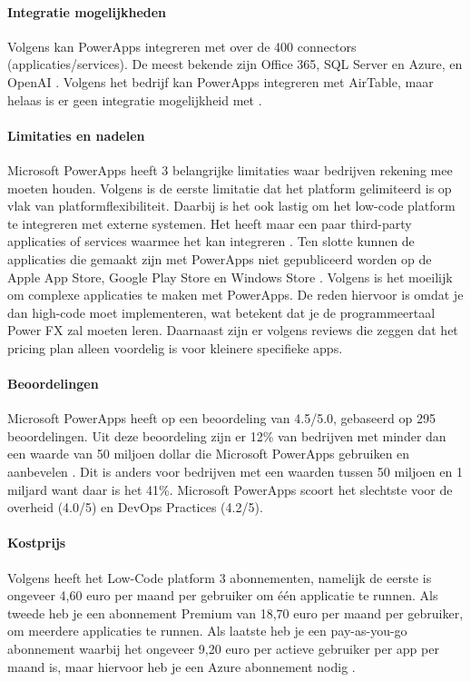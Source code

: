 \paragraph{Integratie mogelijkheden}
Volgens \textcite{Nguyen} kan PowerApps integreren met over de 400 connectors (applicaties/services). De meest bekende 
zijn Office 365, SQL Server en Azure,  en OpenAI \autocite{Nguyen}. Volgens het bedrijf \textcite{Microsoft2024} kan PowerApps integreren met 
AirTable, maar helaas is er geen integratie mogelijkheid met \textcite{MAKE.com2024a}.
\paragraph*{Limitaties en nadelen}
Microsoft PowerApps heeft 3 belangrijke limitaties waar bedrijven rekening mee moeten houden. 
Volgens \textcite{Gupta2023} is de eerste limitatie dat het platform gelimiteerd is op vlak van platformflexibiliteit.
Daarbij is het ook lastig om het low-code platform te integreren met externe systemen. Het heeft maar een paar 
third-party applicaties of services waarmee het kan integreren \autocite{Gupta2023}. Ten slotte kunnen de applicaties die gemaakt zijn met
PowerApps niet gepubliceerd worden op de Apple App Store, Google Play Store en Windows Store \autocite{Gupta2023}.
Volgens \textcite{Nguyen} is het moeilijk om complexe applicaties te maken met PowerApps.
De reden hiervoor is omdat je dan high-code moet implementeren, wat betekent dat je de programmeertaal Power FX zal moeten leren.
Daarnaast zijn er volgens \textcite{Nguyen} reviews die zeggen dat het pricing plan alleen voordelig is voor kleinere specifieke apps.
\paragraph{Beoordelingen}
Microsoft PowerApps heeft op \textcite{Gartner2024} een beoordeling van 4.5/5.0, gebaseerd op 295 beoordelingen.
Uit deze beoordeling zijn er 12\% van bedrijven met minder dan een waarde van 50 miljoen dollar die Microsoft PowerApps gebruiken en aanbevelen \autocite{Gartner2024}.
Dit is anders voor bedrijven met een waarden tussen 50 miljoen en 1 miljard want daar is het 41\%.
Microsoft PowerApps scoort het slechtste voor de overheid (4.0/5) en DevOps Practices (4.2/5).

\paragraph{Kostprijs}
Volgens \textcite{Gupta2023} heeft het Low-Code platform 3 abonnementen, namelijk de eerste is ongeveer 4,60 euro per maand per gebruiker om één applicatie te runnen.
Als tweede heb je een abonnement Premium van 18,70 euro per maand per gebruiker, om meerdere applicaties te runnen. Als laatste heb je een pay-as-you-go abonnement
waarbij het ongeveer 9,20 euro per actieve gebruiker per app per maand is, maar hiervoor heb je een Azure abonnement nodig \autocite{Gupta2023}.
